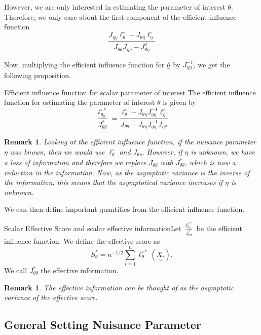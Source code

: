 \documentclass[twoside]{article}
\newtheorem{remark}[theorem]{Remark}
\newcommand{\utilde}{\underset{\sim}}
\begin{document}
However, we are only interested in estimating the parameter of interest $\theta.$ Therefore, we only care about the first component of the efficient influence function
$$
\frac{J_{\eta \eta}\ell_{\theta}^{\circ} - J_{\theta \eta}\ell_{\eta}^{\circ}}{J_{\theta \theta}J_{\eta \eta} - J_{\theta \eta}^2}
$$

Now, multiplying the efficient influence function for $\utilde{\theta}$ by $J_{\eta \eta}^{-1}$, we get the following proposition.
\begin{proposition_exam}{Efficient influence function for scalar parameter of interest}{} The efficient influence function for estimating the parameter of interest $\theta$ is given by 
$$
\frac{\ell_{\theta_{0}}^{\circ *}}{J_{\theta \theta}^{*}} = \frac{\ell_{\theta}^{\circ} - J_{\theta \eta}J_{\eta \eta}^{-1}\ell_{\eta}^{\circ}}{J_{\theta \theta} - J_{\theta \eta}J_{\eta \eta}^{-1}J_{\eta \theta}}
$$
\end{proposition_exam}

\begin{remark}Looking at the efficient influence function, if the nuisance parameter $\eta$ was known, then we would use $\ell_{\theta}^{\circ}$ and $J_{\theta \eta}.$ However, if $\eta$ is unknown, we have a loss of information and therefore we replace $J_{\theta \theta}$ with $J_{\theta \theta}^*$, which is now a reduction in the information. Now, as the asymptotic variance is the inverse of the information, this means that the asymptotical variance increases if $\eta$ is unknown.
\end{remark}

We can then define important quantities from the efficient influence function.

\begin{definition_exam}{Scalar Effective Score and scalar effective information}{}Let $\frac{\ell_{\theta_{0}}^{\circ *}}{J_{\theta \theta}^{*}}$ be the efficient influence function. We define the effective score as 
$$
S_{\theta}^{*} = n^{-1/2}\sum_{i=1}^{n}\ell_{\theta}^{\circ *}(\utilde{X_i}).
$$
We call $J_{\theta \theta}^{*}$ the effective information.
\end{definition_exam}

\begin{remark} The effective information can be thought of as the asymptotic variance of the effective score.
\end{remark}

\subsection{General Setting Nuisance Parameter}
\end{document}

